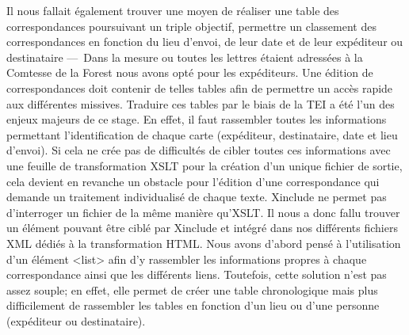 \documentclass[12pt,a4paper]{book} %
\begin{document}
Il nous fallait également trouver une moyen de réaliser une table des correspondances poursuivant un triple objectif, permettre un classement des correspondances en fonction du lieu d'envoi, de leur date et de leur expéditeur ou destinataire ---~Dans la mesure ou toutes les lettres étaient adressées à la Comtesse de la Forest nous avons opté pour les expéditeurs. Une édition de correspondances doit contenir de telles tables afin de permettre un accès rapide aux différentes missives. Traduire ces tables par le biais de la TEI a été l'un des enjeux majeurs de ce stage. En effet, il faut rassembler toutes les informations permettant l'identification de chaque carte (expéditeur, destinataire, date et lieu d'envoi). Si cela ne crée pas de difficultés de cibler toutes ces informations avec une feuille de transformation XSLT pour la création d'un unique fichier de sortie, cela devient en revanche un obstacle pour l'édition d'une correspondance qui demande un traitement individualisé de chaque texte. Xinclude ne permet pas d'interroger un fichier de la même manière qu'XSLT. Il nous a donc fallu trouver un élément pouvant être ciblé par Xinclude et intégré dans nos différents fichiers XML dédiés à la transformation HTML. Nous avons d'abord pensé à l'utilisation d'un élément <list> afin d'y rassembler les informations propres à chaque correspondance ainsi que les différents liens. Toutefois, cette solution n'est pas assez souple; en effet, elle permet de créer une table chronologique mais plus difficilement de rassembler les tables en fonction d'un lieu ou d'une personne (expéditeur ou destinataire). 
\end{document}
